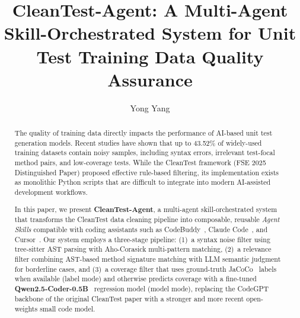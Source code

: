 \documentclass[acmlarge,nonacm,screen]{acmart}
\begin{document}
\title[CleanTest-Agent]{CleanTest-Agent: A Multi-Agent Skill-Orchestrated System for Unit Test Training Data Quality Assurance}

\author{Yong Yang}

\renewcommand{\shortauthors}{Yang}

\begin{abstract}
The quality of training data directly impacts the performance of AI-based unit test generation models. Recent studies have shown that up to 43.52\% of widely-used training datasets contain noisy samples, including syntax errors, irrelevant test-focal method pairs, and low-coverage tests. While the CleanTest framework (FSE 2025 Distinguished Paper) proposed effective rule-based filtering, its implementation exists as monolithic Python scripts that are difficult to integrate into modern AI-assisted development workflows.

In this paper, we present \textbf{CleanTest-Agent}, a multi-agent skill-orchestrated system that transforms the CleanTest data cleaning pipeline into composable, reusable \textit{Agent Skills} compatible with coding assistants such as CodeBuddy~\cite{codebuddy}, Claude Code~\cite{claudecode}, and Cursor~\cite{cursor}. Our system employs a three-stage pipeline: (1)~a syntax noise filter using tree-sitter AST parsing with Aho-Corasick multi-pattern matching, (2)~a relevance filter combining AST-based method signature matching with LLM semantic judgment for borderline cases, and (3)~a coverage filter that uses ground-truth JaCoCo~\cite{jacoco} labels when available (label mode) and otherwise predicts coverage with a fine-tuned \textbf{Qwen2.5-Coder-0.5B}~\cite{hui2024qwen} regression model (model mode), replacing the CodeGPT backbone of the original CleanTest paper with a stronger and more recent open-weights small code model.


\end{abstract}
\end{document}
